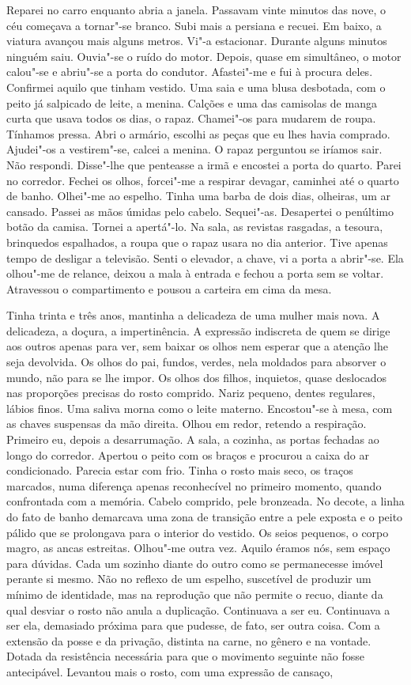 Reparei no carro enquanto abria a janela. Passavam vinte minutos das
nove, o céu começava a tornar"-se branco. Subi mais a persiana e recuei.
Em baixo, a viatura avançou mais alguns metros. Vi"-a estacionar.
Durante alguns minutos ninguém saiu. Ouvia"-se o ruído do motor. Depois,
quase em simultâneo, o motor calou"-se e abriu"-se a porta do condutor.
Afastei"-me e fui à procura deles. Confirmei aquilo que tinham vestido.
Uma saia e uma blusa desbotada, com o peito já salpicado de leite, a
menina. Calções e uma das camisolas de manga curta que usava todos os
dias, o rapaz. Chamei"-os para mudarem de roupa. Tínhamos pressa. Abri o
armário, escolhi as peças que eu lhes havia comprado. Ajudei"-os a
vestirem"-se, calcei a menina. O rapaz perguntou se iríamos sair. Não
respondi. Disse"-lhe que penteasse a irmã e encostei a porta do quarto.
Parei no corredor. Fechei os olhos, forcei"-me a respirar devagar,
caminhei até o quarto de banho. Olhei"-me ao espelho. Tinha uma barba
de dois dias, olheiras, um ar cansado. Passei as mãos úmidas pelo
cabelo. Sequei"-as. Desapertei o penúltimo botão da camisa. Tornei a
apertá"-lo. Na sala, as revistas rasgadas, a tesoura, brinquedos
espalhados, a roupa que o rapaz usara no dia anterior. Tive apenas tempo
de desligar a televisão. Senti o elevador, a chave, vi a porta a
abrir"-se. Ela olhou"-me de relance, deixou a mala à entrada e fechou a
porta sem se voltar. Atravessou o compartimento e pousou a carteira em
cima da mesa.

Tinha trinta e três anos, mantinha a delicadeza de uma mulher mais nova.
A delicadeza, a doçura, a impertinência. A expressão indiscreta de quem
se dirige aos outros apenas para ver, sem baixar os olhos nem esperar
que a atenção lhe seja devolvida. Os olhos do pai, fundos, verdes, nela
moldados para absorver o mundo, não para se lhe impor. Os olhos dos
filhos, inquietos, quase deslocados nas proporções precisas do rosto
comprido. Nariz pequeno, dentes regulares, lábios finos. Uma saliva
morna como o leite materno. Encostou"-se à mesa, com as chaves suspensas
da mão direita. Olhou em redor, retendo a respiração. Primeiro eu,
depois a desarrumação. A sala, a cozinha, as portas fechadas ao longo do
corredor. Apertou o peito com os braços e procurou a caixa do ar
condicionado. Parecia estar com frio. Tinha o rosto mais seco, os traços
marcados, numa diferença apenas reconhecível no primeiro momento, quando
confrontada com a memória. Cabelo comprido, pele bronzeada. No decote, a
linha do fato de banho demarcava uma zona de transição entre a pele
exposta e o peito pálido que se prolongava para o interior do vestido.
Os seios pequenos, o corpo magro, as ancas estreitas. Olhou"-me outra
vez. Aquilo éramos nós, sem espaço para dúvidas. Cada um sozinho diante
do outro como se permanecesse imóvel perante si mesmo. Não no reflexo de
um espelho, suscetível de produzir um mínimo de identidade, mas na
reprodução que não permite o recuo, diante da qual desviar o rosto não
anula a duplicação. Continuava a ser eu. Continuava a ser ela, demasiado
próxima para que pudesse, de fato, ser outra coisa. Com a extensão da
posse e da privação, distinta na carne, no gênero e na vontade. Dotada
da resistência necessária para que o movimento seguinte não fosse
antecipável. Levantou mais o rosto, com uma expressão de cansaço,

